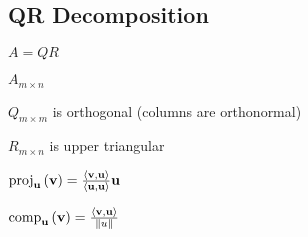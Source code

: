 \documentclass[10pt,letterpaper]{article}
\newenvironment{tight_item}
{\begin{itemize}
\setlength{\parskip}{0pt}
\setlength{\parsep}{0pt}
\setlength{\itemsep}{0pt}
\setlength{\parsep}{0pt}
\setlength{\topsep}{0pt}
\setlength{\partopsep}{0pt}
\setlength{\leftmargin}{0em}
\setlength{\labelwidth}{0em}
\setlength{\labelsep}{0em} }
{\end{itemize}}
\begin{document}
{\begin{multicols*}{5}
\section{QR Decomposition}
\begin{center}
$A = QR$
\end{center}
\begin{tight_item}
\item $A_{m \times n}$
\item $Q_{m \times m}$ is orthogonal (columns are orthonormal)
\item $R_{m \times n}$ is upper triangular
\item $\mathrm{proj}_{\mathbf{u}}\,(\mathbf{v}) = {\langle \mathbf{v},
\mathbf{u}\rangle\over\langle \mathbf{u}, \mathbf{u}\rangle}\mathbf{u}$
\item $\mathrm{comp}_{\mathbf{u}}\,(\mathbf{v}) = {\langle \mathbf{v}, \mathbf{u}\rangle\over \|u\|}$
\end{tight_item}

\end{multicols*}}
\end{document}
